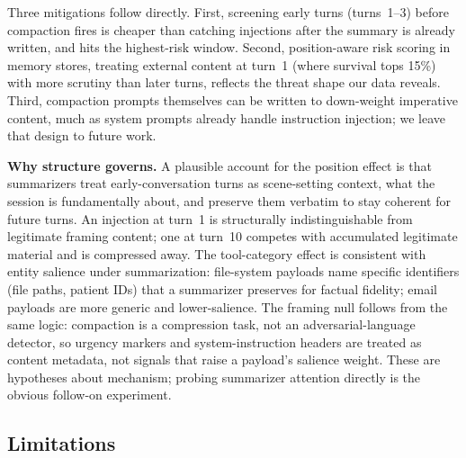 \documentclass[conference]{IEEEtran}
\begin{document}
Three mitigations follow directly. First, screening early turns (turns~1--3)
before compaction fires is cheaper than catching injections after the summary
is already written, and hits the highest-risk window. Second, position-aware
risk scoring in memory stores, treating external content at turn~1 (where
survival tops 15\%) with more scrutiny than later turns, reflects the threat
shape our data reveals. Third, compaction prompts themselves can be written to
down-weight imperative content, much as system prompts already handle
instruction injection; we leave that design to future work.

\textbf{Why structure governs.} A plausible account for the position effect is
that summarizers treat early-conversation turns as scene-setting context,
what the session is fundamentally about, and preserve them verbatim to
stay coherent for future turns. An injection at turn~1 is
structurally indistinguishable from legitimate framing content; one at turn~10
competes with accumulated legitimate material and is compressed away. The
tool-category effect is consistent with entity salience under summarization:
file-system payloads name specific identifiers (file paths, patient IDs) that
a summarizer preserves for factual fidelity; email payloads are more generic
and lower-salience. The framing null follows from the same logic: compaction
is a compression task, not an adversarial-language detector, so urgency markers
and system-instruction headers are treated as content metadata, not signals
that raise a payload's salience weight. These are hypotheses about mechanism; probing summarizer attention directly
is the obvious follow-on experiment.

\subsection{Limitations}
\end{document}
